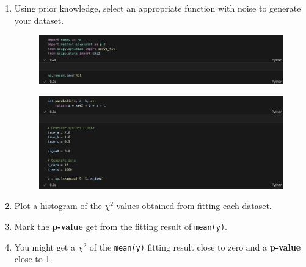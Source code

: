 \documentclass[12pt,a4paper]{article}
\begin{document}
\begin{CJK}{UTF8}{bkai}
\begin{enumerate}
    \item Using prior knowledge, select an appropriate function with noise to generate your dataset.
    \begin{figure}[h]
        \centering
        \includegraphics[width=1\linewidth]{figures/code/practice_2/code_2_1.png}
        \label{fig:code_2_1}
    \end{figure}
    \begin{figure}[h]
        \centering
        \includegraphics[width=1\linewidth]{figures/code/practice_2/code_2_2.png}
        \label{fig:code_2_2}
    \end{figure}
    \item Plot a histogram of the $\chi^2$ values obtained from fitting each dataset.
    \item Mark the \textbf{p-value} get from the fitting result of \texttt{mean(y)}.
    \item You might get a $\chi^2$ of the \texttt{mean(y)} fitting result close to zero and a \textbf{p-value} close to 1.

\end{enumerate}
\end{CJK}
\end{document}
